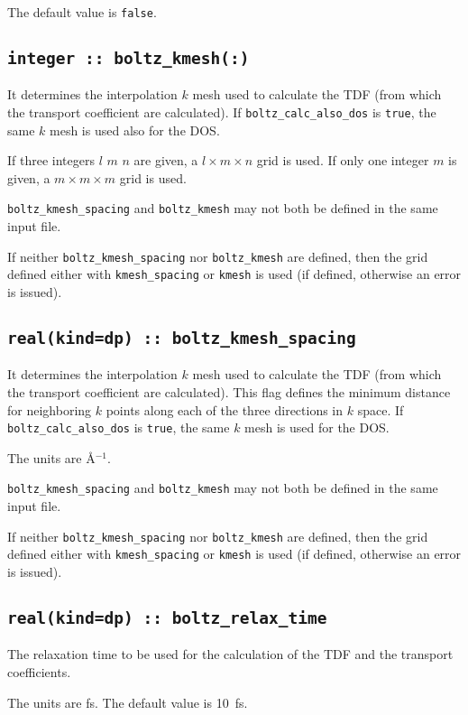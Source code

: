 The default value is \verb#false#.

\subsection[boltz\_kmesh]{\tt integer :: boltz\_kmesh(:)}
It determines the interpolation $k$ mesh used to calculate the TDF (from which the transport coefficient are calculated). If {\tt boltz\_calc\_also\_dos} is \verb#true#, the same $k$ mesh is used also for the DOS.

If three integers $l$ $m$ $n$ are given, a $l\times m\times n$ grid is used. If only one integer $m$ is given, a $m\times m\times m$ grid is used.

{\tt boltz\_kmesh\_spacing} and  {\tt boltz\_kmesh} may not both be defined in the same input file.

If neither {\tt boltz\_kmesh\_spacing} nor  {\tt boltz\_kmesh} are defined, then the grid defined either with {\tt kmesh\_spacing} or {\tt kmesh} is used (if defined, otherwise an error is issued).

\subsection[boltz\_kmesh\_spacing]{\tt real(kind=dp) :: boltz\_kmesh\_spacing}
It determines the interpolation $k$ mesh used to calculate the TDF (from which the transport coefficient are calculated). This flag defines the minimum distance for neighboring $k$ points along each of the three directions in $k$ space. If {\tt boltz\_calc\_also\_dos} is \verb#true#, the same $k$ mesh is used for the DOS.

The units are \AA$^{-1}$.

{\tt boltz\_kmesh\_spacing} and  {\tt boltz\_kmesh} may not both be defined in the same input file.

If neither {\tt boltz\_kmesh\_spacing} nor  {\tt boltz\_kmesh} are defined, then the grid defined either with {\tt kmesh\_spacing} or {\tt kmesh} is used (if defined, otherwise an error is issued).

\subsection[boltz\_relax\_time]{\tt real(kind=dp) :: boltz\_relax\_time}
The relaxation time to be used for the calculation of the TDF and the transport coefficients.

The units are fs.
The default value is 10~fs.

